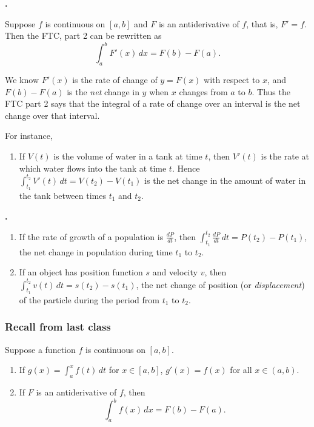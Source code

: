 \documentclass[t]{beamer}
\theoremstyle{plain}
\theoremstyle{definition}
\newcommand{\ds}{\displaystyle}
\newcommand{\dx}{\,dx}
\newcounter{heading}
\newcommand{\newhead}[1]{\medskip\stepcounter{heading}\noindent\textbf{\hspace{0.2cm}{#1}.}}
\begin{document}
\begin{frame}
\newhead{Applications}

\noindent Suppose $f$ is continuous on $[a,b]$ and $F$ is an antiderivative of $f$, that is, $F'=f$.  Then the FTC, part 2 can be rewritten as \[\int_{a}^{b}F'(x)\,dx = F(b) - F(a).\]  \pause

\noindent We know $F'(x)$ is the rate of change of $y=F(x)$ with respect to $x$, and $F(b) - F(a)$ is the \emph{net} change in $y$ when $x$ changes from $a$ to $b$.  Thus the FTC part 2 says that the integral of a rate of change over an interval is the net change over that interval.\pause

\noindent For instance,
\begin{enumerate}[<+->]
\item If $V(t)$ is the volume of water in a tank at time $t$, then $V'(t)$ is the rate at which water flows into the tank at time $t$.  Hence $\int_{t_{1}}^{t_{2}}V'(t)\,dt = V(t_{2}) - V(t_{1})$ is the net change in the amount of water in the tank between times $t_{1}$ and $t_{2}$.
\end{enumerate}
\end{frame}

\begin{frame}
\newhead{Applications}

\begin{enumerate}[<+->]
\addtocounter{enumi}{1}
\item If the rate of growth of a population is $\frac{dP}{dt}$, then $\int_{t_{1}}^{t_{2}}\frac{dP}{dt}\,dt = P(t_{2}) - P(t_{1})$, the net change in population during time $t_{1}$ to $t_{2}$.
\item If an object has position function $s$ and velocity $v$, then $\int_{t_{1}}^{t_{2}}v(t)\,dt = s(t_{2}) - s(t_{1})$, the net change of position (or \emph{displacement}) of the particle during the period from $t_{1}$ to $t_{2}$.
\end{enumerate}

\end{frame}



\begin{frame}[label=tues]
\frametitle{Recall from last class}
\begin{theorem}
Suppose a function $f$ is continuous on $[a,b]$.
\begin{enumerate}[<+->]
\item If $g(x)=\ds\int^x_af(t)\,dt$ for $x\in [a,b]$, $g'(x)=f(x)$ for all $x\in (a,b)$.
\item If $F$ is an antiderivative of $f$, then \[ \int_a^bf(x)\dx=F(b)-F(a). \]
\end{enumerate}
\end{theorem}
\end{frame}
\end{document}
